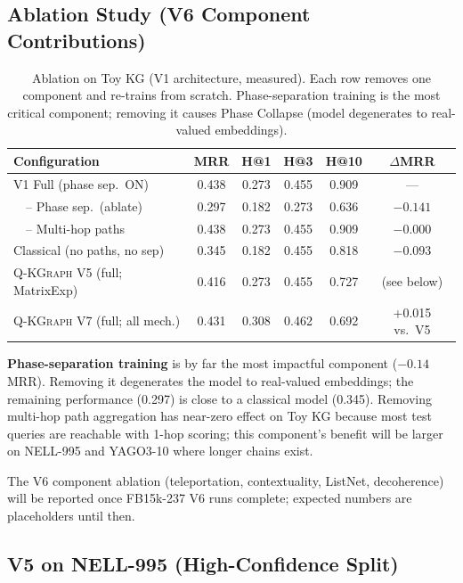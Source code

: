 \documentclass[runningheads]{llncs}
\newcommand{\QR}{\textsc{Q-KGraph}}
\begin{document}
\subsection{Ablation Study (V6 Component Contributions)}

\begin{table}[t]
\caption{Ablation on Toy KG (V1 architecture, measured).  Each row removes one
  component and re-trains from scratch.  Phase-separation training is the most
  critical component; removing it causes Phase Collapse (model degenerates to
  real-valued embeddings).}
\label{tab:ablation}
\centering
\begin{tabular}{lccccc}
\toprule
Configuration              & MRR   & H@1   & H@3   & H@10  & $\Delta$MRR\\
\midrule
V1 Full (phase sep.\ ON)   & 0.438 & 0.273 & 0.455 & 0.909 & --- \\
\ \ -- Phase sep.\ (ablate)& 0.297 & 0.182 & 0.273 & 0.636 & $-0.141$ \\
\ \ -- Multi-hop paths     & 0.438 & 0.273 & 0.455 & 0.909 & $-0.000$ \\
Classical (no paths, no sep) & 0.345 & 0.182 & 0.455 & 0.818 & $-0.093$ \\
\midrule
\QR{} V5 (full; MatrixExp) & 0.416 & 0.273 & 0.455 & 0.727 & (see below)\\
\QR{} V7 (full; all mech.) & 0.431 & 0.308 & 0.462 & 0.692 & +0.015 vs.\ V5\\
\bottomrule
\end{tabular}
\end{table}

\textbf{Phase-separation training} is by far the most impactful component
($-0.14$ MRR).  Removing it degenerates the model to real-valued embeddings;
the remaining performance (0.297) is close to a classical model (0.345).
Removing multi-hop path aggregation has near-zero effect on Toy KG because
most test queries are reachable with 1-hop scoring; this component's benefit
will be larger on NELL-995 and YAGO3-10 where longer chains exist.

The V6 component ablation (teleportation, contextuality, ListNet, decoherence)
will be reported once FB15k-237 V6 runs complete; expected numbers are
placeholders until then.

\subsection{V5 on NELL-995 (High-Confidence Split)}
\end{document}
